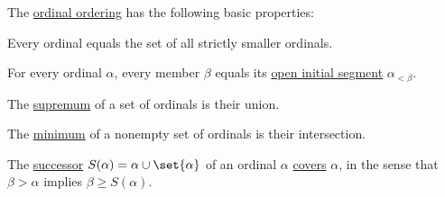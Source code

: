 \begin{proposition}\label{thm:def:ordinal_ordering}
  The \hyperref[def:ordinal_ordering]{ordinal ordering} has the following basic properties:
  \begin{thmenum}
     Every ordinal equals the set of all strictly smaller ordinals.

     For every ordinal \( \alpha \), every member \( \beta \) equals its \hyperref[def:order_interval/unbounded]{open initial segment} \( \alpha_{<\beta} \).

     The \hyperref[def:extremal_points/supremum_and_infimum]{supremum} of a set of ordinals is their union.

     The \hyperref[def:extremal_points/maximum_and_minimum]{minimum} of a nonempty set of ordinals is their intersection.

     The \hyperref[def:ordinal_successor]{successor} \( S(\alpha) = \alpha \cup \set{ \alpha } \) of an ordinal \( \alpha \) \hyperref[def:partial_order_covering]{covers} \( \alpha \), in the sense that \( \beta > \alpha \) implies \( \beta \geq S(\alpha) \).
  \end{thmenum}
\end{proposition}
